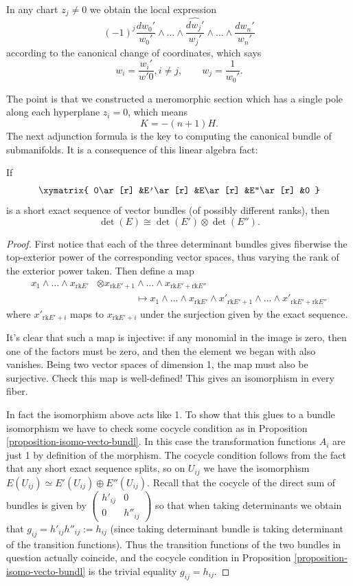 \documentclass{book}
\begin{document}
In any chart $z_j\neq 0$ we obtain the local
expression
$$
(-1)^j\frac{dw_0'}{w_0'}
\wedge…
\wedge \widehat{\frac{dw_j'}{w_j'}}
\wedge…
\wedge \frac{dw_n'}{w_n'}
$$
according to the canonical change of
coordinates, which says
$$
w_i=\frac{w_i'}{w'0}, i\neq j,\qquad
w_j=\frac{1}{w_0'}.
$$

The point is that we constructed a
meromorphic section which has
a single pole along each hyperplane $z_i=0$,
which means
$$
K=-(n+1)H.
$$
\medskip\noindent
The next adjunction formula is the key to
computing
the canonical bundle of submanifolds.
It is a consequence of this linear algebra
fact:

\begin{lemma}
\label{lemma-detrminant-of-ses}
If
$$
\xymatrix{
0\ar[r]
&E'\ar[r]
&E\ar[r]
&E''\ar[r]
&0
}
$$
is a short exact sequence of vector bundles
(of possibly different ranks),
then
$$
\det(E)\cong \det(E')\otimes \det(E'').
$$
\end{lemma}

\begin{proof}
First notice that each of the three
determinant bundles gives fiberwise the
top-exterior
power of the corresponding vector spaces,
thus varying the rank of the exterior power
taken.
Then define a map
$$
\begin{aligned}
x_1 \wedge…\wedge x_{\text{rk}E'}
&\otimes x_{\text{rk}E'+1}\wedge…\wedge
x_{\text{rk}E'+\text{rk}E''}\\
&\qquad \qquad \mapsto x_1 \wedge…\wedge
x_{\text{rk}E'}
\wedge x'_{\text{rk}E'+1}\wedge…\wedge
x'_{\text{rk}E'+\text{rk}E''}
\end{aligned}
$$
where $x'_{\text{rk}E'+i}$ maps to
$x_{\text{rk}E'+i}$
under the surjection given by the exact
sequence.

It's clear that such a map is injective:
if any monomial in the image is zero, then
one of the
factors must be zero, and then the element
we began with also vanishes.
Being two vector spaces of dimension 1,
the map must also be surjective.
Check this map is well-defined!
This gives an isomorphism in every fiber.

In fact the isomorphism above acts like 1.
To show that this glues to a bundle
isomorphism
we have to check some cocycle condition
as in Proposition
\ref{proposition-isomo-vecto-bundl}.
In this case the transformation functions
$A_i$
are just 1 by definition of the morphism.
The cocycle condition follows from the fact
that
any short exact sequence splits,
so on $U_{ij}$ we have the isomorphism
$E(U_{ij}) \simeq E'(U_{ij})\oplus
E''(U_{ij})$.
Recall that the cocycle of the direct sum of
bundles is given by
$\begin{pmatrix}h'_{ij}&0\\
0&h''_{ij}\end{pmatrix}$
so that when taking determinants
we obtain that
$g_{ij}=h'_{ij}h''_{ij}:=h_{ij}$
(since taking determinant bundle is taking
determinant of
the transition functions).
Thus the transition functions of the two
bundles in question
actually coincide,
and the cocycle condition in Proposition
\ref{proposition-isomo-vecto-bundl}
is the trivial equality $g_{ij}=h_{ij}$.
\end{proof}
\end{document}
